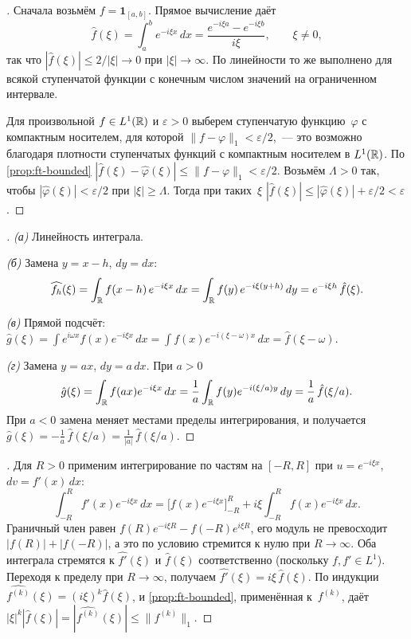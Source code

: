 \begin{proof}[]
Сначала возьмём $f = \mathbf{1}_{[a, b]}$. Прямое вычисление даёт
\[
  \hat f(\xi) = \int_a^b e^{-i \xi x}\, dx = \frac{e^{-i \xi a} - e^{-i \xi b}}{i \xi}, \qquad \xi \neq 0,
\]
так что $|\hat f(\xi)| \leq 2/|\xi| \to 0$ при $|\xi| \to \infty$. По
линейности то же выполнено для всякой ступенчатой функции с конечным
числом значений на ограниченном интервале.

Для произвольной $f \in L^1(\mathbb{R})$ и $\varepsilon > 0$ выберем
ступенчатую функцию~$\varphi$ с компактным носителем, для которой
$\|f - \varphi\|_1 < \varepsilon/2$,~--- это возможно благодаря
плотности ступенчатых функций с компактным носителем в $L^1(\mathbb{R})$. По
\cref{prop:ft-bounded}
$|\hat f(\xi) - \hat \varphi(\xi)| \leq \|f - \varphi\|_1 < \varepsilon/2$.
Возьмём $\Lambda > 0$ так, чтобы $|\hat \varphi(\xi)| < \varepsilon/2$
при $|\xi| \geq \Lambda$. Тогда при таких~$\xi$
$|\hat f(\xi)| \leq |\hat \varphi(\xi)| + \varepsilon/2 < \varepsilon$.
\end{proof}

\begin{proof}[]
\emph{(а)} Линейность интеграла.

\emph{(б)} Замена $y = x - h$, $dy = dx$:
\[
  \widehat{f_h}(\xi) = \int_{\mathbb{R}} f(x - h)\, e^{-i \xi x}\, dx
                     = \int_{\mathbb{R}} f(y)\, e^{-i \xi (y + h)}\, dy
                     = e^{-i \xi h}\, \hat f(\xi).
\]

\emph{(в)} Прямой подсчёт:
$\hat g(\xi) = \int e^{i \omega x} f(x) e^{-i \xi x}\, dx
= \int f(x) e^{-i (\xi - \omega) x}\, dx = \hat f(\xi - \omega)$.

\emph{(г)} Замена $y = a x$, $dy = a\, dx$. При $a > 0$
\[
  \hat g(\xi) = \int_{\mathbb{R}} f(a x) e^{-i \xi x}\, dx
              = \frac{1}{a} \int_{\mathbb{R}} f(y) e^{-i (\xi/a) y}\, dy
              = \frac{1}{a}\, \hat f(\xi/a).
\]
При $a < 0$ замена меняет местами пределы интегрирования, и получается
$\hat g(\xi) = -\tfrac{1}{a}\, \hat f(\xi/a) = \tfrac{1}{|a|}\, \hat f(\xi/a)$.
\end{proof}

\begin{proof}[]
Для $R > 0$ применим интегрирование по частям на $[-R, R]$ при
$u = e^{-i\xi x}$, $dv = f'(x)\, dx$:
\[
  \int_{-R}^{R} f'(x) e^{-i\xi x}\, dx
  = \bigl[f(x) e^{-i\xi x}\bigr]_{-R}^{R}
    + i\xi \int_{-R}^{R} f(x) e^{-i\xi x}\, dx.
\]
Граничный член равен $f(R) e^{-i\xi R} - f(-R) e^{i\xi R}$, его
модуль не превосходит $|f(R)| + |f(-R)|$, а это по условию стремится
к нулю при $R \to \infty$. Оба интеграла стремятся к
$\widehat{f'}(\xi)$ и $\hat f(\xi)$ соответственно (поскольку
$f, f' \in L^1$). Переходя к пределу при $R \to \infty$, получаем
$\widehat{f'}(\xi) = i\xi\, \hat f(\xi)$. По индукции
$\widehat{f^{(k)}}(\xi) = (i\xi)^k \hat f(\xi)$, и
\cref{prop:ft-bounded}, применённая к~$f^{(k)}$, даёт
$|\xi|^k |\hat f(\xi)| = |\widehat{f^{(k)}}(\xi)| \leq \|f^{(k)}\|_1$.
\end{proof}

